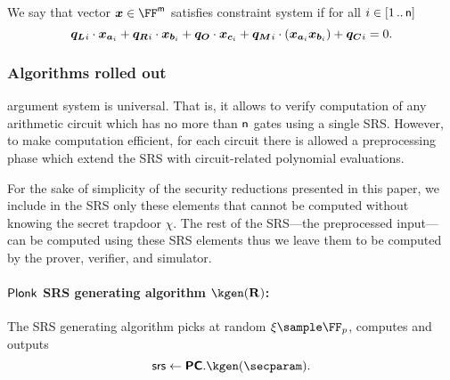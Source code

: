 \documentclass[runningheads,11pt]{llncs}
\begin{document}
We say that vector $\vx \in \FF^\noofw$ satisfies constraint system if for all $i
\in [1 \, .. \, \mathsf{n}]$
\[
  \vql_i \cdot \vx_{\va_i} + \vqr_i \cdot \vx_{\vb_i} + \vqo \cdot \vx_{\vc_i} +
  \vqm_i \cdot (\vx_{\va_i} \vx_{\vb_i}) + \vqc_i = 0. 
\]

\subsubsection{Algorithms rolled out}
\label{sec:plonk_explained}
\plonk{} argument system is universal. That is, it allows to verify computation
of any arithmetic circuit which has no more than $\mathsf{n}$
gates using a single SRS. However, to make computation efficient, for each
circuit there is allowed a preprocessing phase which extend the SRS with
circuit-related polynomial evaluations.

For the sake of simplicity of the security reductions presented in this paper, we
include in the SRS only these elements that cannot be computed without knowing
the secret trapdoor $\chi$. The rest of the SRS---the preprocessed input---can
be computed using these SRS elements thus we leave them to be computed by the
prover, verifier, and simulator.

\paragraph{$\textnormal{\textsf{Plonk}}$ SRS generating algorithm $\kgen(\REL)$:}
The SRS generating algorithm picks at random $\xi \sample \FF_p$, computes
and outputs
\[
	\srs \gets \PCOM.\kgen(\secparam).
\]
\end{document}
